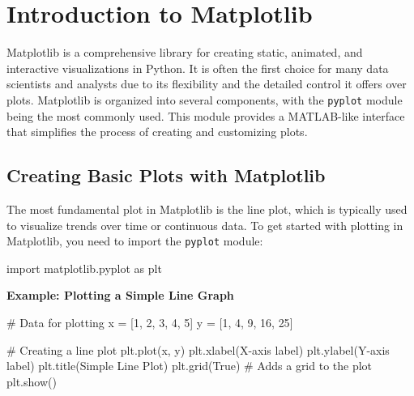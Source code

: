 \documentclass[
  letterpaper,
  DIV=11,
  numbers=noendperiod]{scrreprt}
\newenvironment{Shaded}{\begin{snugshade}}{\end{snugshade}}
\newcommand{\CommentTok}[1]{\textcolor[rgb]{0.37,0.37,0.37}{#1}}
\newcommand{\DecValTok}[1]{\textcolor[rgb]{0.68,0.00,0.00}{#1}}
\newcommand{\ImportTok}[1]{\textcolor[rgb]{0.00,0.46,0.62}{#1}}
\newcommand{\NormalTok}[1]{\textcolor[rgb]{0.00,0.23,0.31}{#1}}
\newcommand{\OperatorTok}[1]{\textcolor[rgb]{0.37,0.37,0.37}{#1}}
\newcommand{\StringTok}[1]{\textcolor[rgb]{0.13,0.47,0.30}{#1}}
\newcommand{\VariableTok}[1]{\textcolor[rgb]{0.07,0.07,0.07}{#1}}
\begin{document}
\hypertarget{introduction-to-matplotlib}{%
\section{Introduction to Matplotlib}\label{introduction-to-matplotlib}}

Matplotlib is a comprehensive library for creating static, animated, and
interactive visualizations in Python. It is often the first choice for
many data scientists and analysts due to its flexibility and the
detailed control it offers over plots. Matplotlib is organized into
several components, with the \texttt{pyplot} module being the most
commonly used. This module provides a MATLAB-like interface that
simplifies the process of creating and customizing plots.

\hypertarget{creating-basic-plots-with-matplotlib}{%
\subsection{Creating Basic Plots with
Matplotlib}\label{creating-basic-plots-with-matplotlib}}

The most fundamental plot in Matplotlib is the line plot, which is
typically used to visualize trends over time or continuous data. To get
started with plotting in Matplotlib, you need to import the
\texttt{pyplot} module:

\begin{Shaded}
\begin{Highlighting}[]
\ImportTok{import}\NormalTok{ matplotlib.pyplot }\ImportTok{as}\NormalTok{ plt}
\end{Highlighting}
\end{Shaded}

\textbf{Example: Plotting a Simple Line Graph}

\begin{Shaded}
\begin{Highlighting}[]
\CommentTok{\# Data for plotting}
\NormalTok{x }\OperatorTok{=}\NormalTok{ [}\DecValTok{1}\NormalTok{, }\DecValTok{2}\NormalTok{, }\DecValTok{3}\NormalTok{, }\DecValTok{4}\NormalTok{, }\DecValTok{5}\NormalTok{]}
\NormalTok{y }\OperatorTok{=}\NormalTok{ [}\DecValTok{1}\NormalTok{, }\DecValTok{4}\NormalTok{, }\DecValTok{9}\NormalTok{, }\DecValTok{16}\NormalTok{, }\DecValTok{25}\NormalTok{]}

\CommentTok{\# Creating a line plot}
\NormalTok{plt.plot(x, y)}
\NormalTok{plt.xlabel(}\StringTok{\textquotesingle{}X{-}axis label\textquotesingle{}}\NormalTok{)}
\NormalTok{plt.ylabel(}\StringTok{\textquotesingle{}Y{-}axis label\textquotesingle{}}\NormalTok{)}
\NormalTok{plt.title(}\StringTok{\textquotesingle{}Simple Line Plot\textquotesingle{}}\NormalTok{)}
\NormalTok{plt.grid(}\VariableTok{True}\NormalTok{)  }\CommentTok{\# Adds a grid to the plot}
\NormalTok{plt.show()}
\end{Highlighting}
\end{Shaded}
\end{document}
